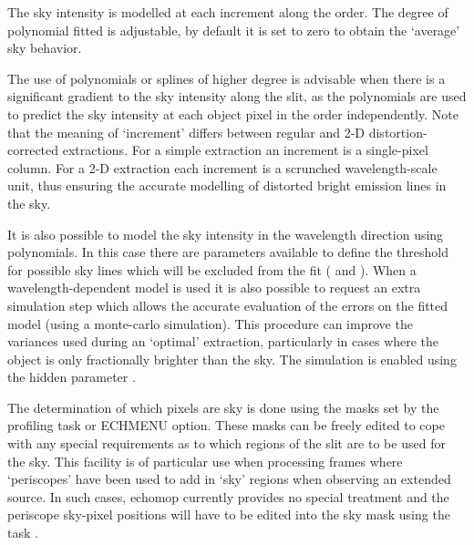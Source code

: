 

The sky intensity is modelled at each increment along the order.
The degree of polynomial fitted is adjustable, by default it is set to zero
to obtain the `average' sky behavior.

The use of polynomials or splines of higher degree is advisable when there
is a significant gradient to the sky intensity along the slit, as the
polynomials are used to predict the sky intensity at each object pixel
in the order independently.
Note that the meaning of `increment' differs between regular and 2-D
distortion-corrected extractions.
For a simple extraction an increment is a single-pixel column.
For a 2-D extraction each increment is a scrunched wavelength-scale unit,
thus ensuring the accurate modelling of distorted bright emission lines
in the sky.

It is also possible to model the sky intensity in the wavelength
direction using polynomials.
In this case there are parameters available to define the threshold for
possible sky lines which will be excluded from the fit
( and
).
When a wavelength-dependent model is used it is also possible to request
an extra simulation step which allows the accurate evaluation of the
errors on the fitted model (using a monte-carlo simulation). This
procedure can improve the variances used during an `optimal' extraction,
particularly in cases where the object is only fractionally brighter
than the sky.
The simulation is enabled using the hidden parameter
.

The determination of which pixels are sky is done using the masks
set by the profiling task or ECHMENU option.
These masks can be freely edited to cope with any special requirements as
to which regions of the slit are to be used for the sky.
This facility is of particular use when processing frames where
`periscopes' have been used to add in `sky' regions when observing an
extended source.
In such cases, {\sc echomop} currently provides no special
treatment and the periscope sky-pixel positions will have to be edited
into the sky mask using the task .

